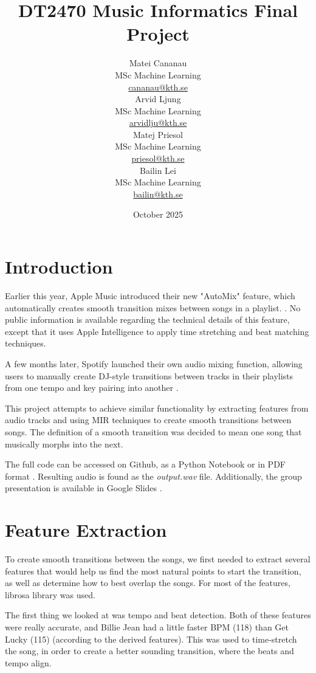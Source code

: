 \documentclass{article}
\title{DT2470 Music Informatics Final Project}
\date{October 2025}
\author{
    \begin{minipage}[t]{0.24\textwidth}
        \centering
        Matei Cananau \\
        MSc Machine Learning \\
        \href{mailto:cananau@kth.se}{cananau@kth.se}
    \end{minipage}
    \hfill
    \begin{minipage}[t]{0.24\textwidth}
        \centering
        Arvid Ljung \\
        MSc Machine Learning \\
        \href{mailto:arvidlju@kth.se}{arvidlju@kth.se}
    \end{minipage}
    \hfill
    \begin{minipage}[t]{0.24\textwidth}
        \centering
        Matej Priesol \\
        MSc Machine Learning \\
        \href{mailto:priesol@kth.se}{priesol@kth.se}
    \end{minipage}
    \hfill
    \begin{minipage}[t]{0.24\textwidth}
        \centering
        Bailin Lei \\
        MSc Machine Learning \\
        \href{mailto:bailin@kth.se}{bailin@kth.se}
    \end{minipage}
}
\begin{document}
\maketitle

\tableofcontents

\newpage

\section{Introduction}

Earlier this year, Apple Music introduced their new "AutoMix" feature, which automatically creates smooth transition mixes between songs in a playlist. \cite{apple2025}. No public information is available regarding the technical details of this feature, except that it uses Apple Intelligence to apply time stretching and beat matching techniques.

A few months later, Spotify launched their own audio mixing function, allowing users to manually create DJ-style transitions between tracks in their playlists from one tempo and key pairing into another \cite{spotify2025}.

This project attempts to achieve similar functionality by extracting features from audio tracks and using MIR techniques to create smooth transitions between songs. The definition of a smooth transition was decided to mean one song that musically morphs into the next.

The full code can be accessed on Github, as a Python Notebook or in PDF format \cite{github_repo}. Resulting audio is found as the \textit{output.wav} file. Additionally, the group presentation is available in Google Slides \cite{presentation}.

\section{Feature Extraction}

To create smooth transitions between the songs, we first needed to extract several features that would help us find the most natural points to start the transition, as well as determine how to best overlap the songs. For most of the features, librosa library was used.

The first thing we looked at was tempo and beat detection. Both of these features were really accurate, and Billie Jean had a little faster BPM (118) than Get Lucky (115) (according to the derived features). This was used to time-stretch the song, in order to create a better sounding transition, where the beats and tempo align.
\end{document}
